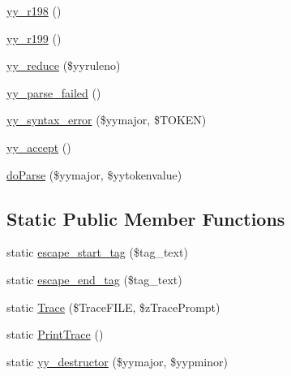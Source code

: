 \begin{DoxyCompactItemize}
\item 
\hyperlink{class_smarty___internal___templateparser_aa62fa80ccbb5c9d1b493f8ff5d54694b}{yy\+\_\+r198} ()
\item 
\hyperlink{class_smarty___internal___templateparser_a3e975224f1817f7b3aac75bd800896af}{yy\+\_\+r199} ()
\item 
\hyperlink{class_smarty___internal___templateparser_a9b9074bf8eda812ae40e81d76b09f24e}{yy\+\_\+reduce} (\$yyruleno)
\item 
\hyperlink{class_smarty___internal___templateparser_a0ba6c1f3560f50c608cac17178214249}{yy\+\_\+parse\+\_\+failed} ()
\item 
\hyperlink{class_smarty___internal___templateparser_aed886d19185ecb1ecae63806ab082da2}{yy\+\_\+syntax\+\_\+error} (\$yymajor, \$T\+O\+K\+E\+N)
\item 
\hyperlink{class_smarty___internal___templateparser_a0fae14dd92f463ead96eac62d238f25e}{yy\+\_\+accept} ()
\item 
\hyperlink{class_smarty___internal___templateparser_af8c096191b13b43b8aa17e6e9dc55bf9}{do\+Parse} (\$yymajor, \$yytokenvalue)
\end{DoxyCompactItemize}
\subsection*{Static Public Member Functions}
\begin{DoxyCompactItemize}
\item 
static \hyperlink{class_smarty___internal___templateparser_a7880fe2f7f5644104daa53c370f235b1}{escape\+\_\+start\+\_\+tag} (\$tag\+\_\+text)
\item 
static \hyperlink{class_smarty___internal___templateparser_a2912b68915829eb2a29e672177114e21}{escape\+\_\+end\+\_\+tag} (\$tag\+\_\+text)
\item 
static \hyperlink{class_smarty___internal___templateparser_a20a25ab18c1b5426baf7dc89069cd3e3}{Trace} (\$Trace\+F\+I\+L\+E, \$z\+Trace\+Prompt)
\item 
static \hyperlink{class_smarty___internal___templateparser_a27e87f0e845570496a0ee634ecd10976}{Print\+Trace} ()
\item 
static \hyperlink{class_smarty___internal___templateparser_a60739e78e8ad88d53328416e0fcf5f64}{yy\+\_\+destructor} (\$yymajor, \$yypminor)
\end{DoxyCompactItemize}
